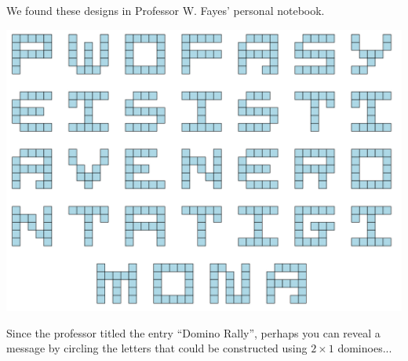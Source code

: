 


  We found these designs in Professor W. Fayes' personal notebook.

\begin{center}
\includegraphics[width=0.8\linewidth]{letters}
\end{center}

  Since the professor titled the entry ``Domino Rally'',
  perhaps you can reveal a message by circling the letters
  that could be constructed using \(2\times1\) dominoes...

\begin{center}
  \phLetterBox{}{}
  \phLetterBox{}{}
  \phLetterBox{}{}
  \phLetterBox{}{}
  \phLetterBox{}{}
  \phLetterBox{}{}
  \phLetterBox{}{}
  \phLetterBox{}{}
\end{center}
\begin{center}
  \phLetterBox{}{}
  \phLetterBox{}{}
  \phLetterBox{}{}
  \phLetterBox{}{}
  \phLetterBox{}{}
  \phLetterBox{}{}
  \phLetterBox{}{}
  \phLetterBox{}{}
\end{center}